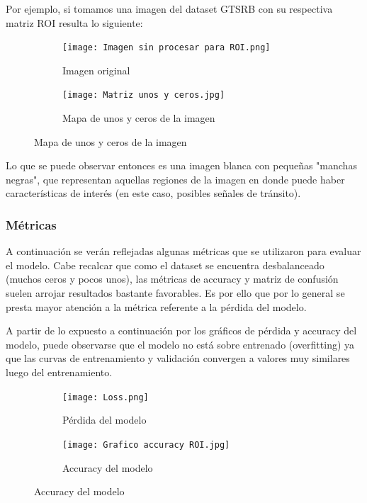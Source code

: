     Por ejemplo, si tomamos una imagen del dataset GTSRB con su respectiva matriz ROI resulta lo siguiente:

    \begin{figure}[ht]
			\centering
			\begin{subfigure}[t]{.47\textwidth}
				\centering
				\texttt{[image: Imagen sin procesar para ROI.png]}
                \caption{Imagen original}
			\end{subfigure}
			\begin{subfigure}[t]{.47\textwidth}
				\centering
				\texttt{[image: Matriz unos y ceros.jpg]}
                \caption{Mapa de unos y ceros de la imagen}
			\end{subfigure}
	\end{figure}	
    Lo que se puede observar entonces es una imagen blanca con pequeñas "manchas negras", que representan aquellas regiones de la imagen en donde puede haber características de interés (en este caso, posibles señales de tránsito).

    \subsubsection{Métricas}

    A continuación se verán reflejadas algunas métricas que se utilizaron para evaluar el modelo. Cabe recalcar que como el dataset se encuentra desbalanceado (muchos ceros y pocos unos), las métricas de accuracy y matriz de confusión suelen arrojar resultados bastante favorables. Es por ello que por lo general se presta mayor atención a la métrica referente a la pérdida del modelo.
    \pagebreak

    A partir de lo expuesto a continuación por los gráficos de pérdida y accuracy del modelo, puede observarse que el modelo no está sobre entrenado (overfitting) ya que las curvas de entrenamiento y validación convergen a valores muy similares luego del entrenamiento.

    \vspace{0.2cm}

    \begin{figure}[ht]
			\centering
			\begin{subfigure}[t]{.47\textwidth}
        	    \centering
        		\texttt{[image: Loss.png]}
        		\caption{Pérdida del modelo}
			\end{subfigure}
			\begin{subfigure}[t]{.47\textwidth}
        	    \centering
        		\texttt{[image: Grafico accuracy ROI.jpg]}
        		\caption{Accuracy del modelo}
			\end{subfigure}
	\end{figure}	

